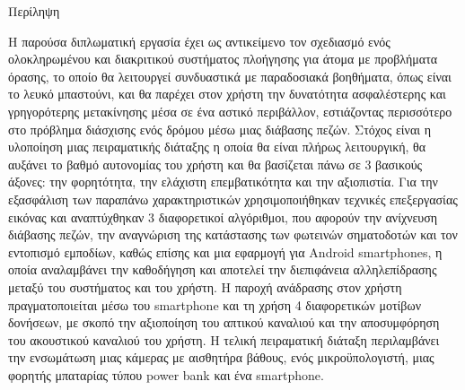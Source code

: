 \pagestyle{plain}
\begin{center}
{\LARGE Περίληψη}\\[1cm]
\end{center}

Η παρούσα διπλωματική εργασία έχει ως αντικείμενο τον σχεδιασμό ενός ολοκληρωμένου και διακριτικού συστήματος πλοήγησης για άτομα με προβλήματα όρασης, το οποίο θα λειτουργεί συνδυαστικά με παραδοσιακά βοηθήματα, όπως είναι το λευκό μπαστούνι, και θα παρέχει στον χρήστη την δυνατότητα ασφαλέστερης και γρηγορότερης μετακίνησης μέσα σε ένα αστικό περιβάλλον, εστιάζοντας περισσότερο στο πρόβλημα διάσχισης ενός δρόμου μέσω μιας διάβασης πεζών. Στόχος είναι η υλοποίηση μιας πειραματικής διάταξης η οποία θα είναι πλήρως λειτουργική, θα αυξάνει το βαθμό αυτονομίας του χρήστη και θα βασίζεται πάνω σε 3 βασικούς άξονες: την φορητότητα, την ελάχιστη επεμβατικότητα και την αξιοπιστία. Για την εξασφάλιση των παραπάνω χαρακτηριστικών χρησιμοποιήθηκαν τεχνικές επεξεργασίας εικόνας και αναπτύχθηκαν 3 διαφορετικοί αλγόριθμοι, που αφορούν την ανίχνευση διάβασης πεζών, την αναγνώριση της κατάστασης των φωτεινών σηματοδοτών και τον εντοπισμό εμποδίων, καθώς επίσης και μια εφαρμογή για Android smartphones, η οποία αναλαμβάνει την καθοδήγηση και αποτελεί την διεπιφάνεια αλληλεπίδρασης μεταξύ του συστήματος και του χρήστη. Η παροχή ανάδρασης στον χρήστη πραγματοποιείται μέσω του smartphone και τη χρήση 4 διαφορετικών μοτίβων δονήσεων, με σκοπό την αξιοποίηση του απτικού καναλιού και την αποσυμφόρηση του ακουστικού καναλιού του χρήστη. Η τελική πειραματική διάταξη περιλαμβάνει την ενσωμάτωση μιας κάμερας με αισθητήρα βάθους, ενός μικροϋπολογιστή, μιας φορητής μπαταρίας τύπου power bank και ένα smartphone.
